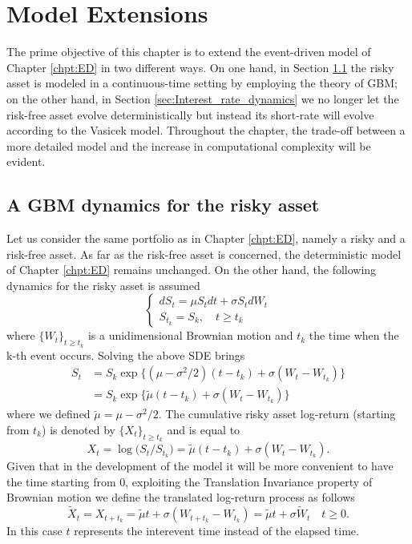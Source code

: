 \chapter{Model Extensions}
The prime objective of this chapter is to extend the event-driven model of Chapter \ref{chpt:ED} in two different ways. On one hand, in Section \ref{sec:GBM} the risky asset is modeled in a continuous-time setting by employing the theory of \gls{GBM}; on the other hand, in Section \ref{sec:Interest_rate_dynamics} we no longer let the risk-free asset evolve deterministically but instead its short-rate will evolve according to the Vasicek model. Throughout the chapter, the trade-off between a more detailed model and the increase in computational complexity will be evident.
\section{A GBM dynamics for the risky asset}\label{sec:GBM}
Let us consider the same portfolio as in Chapter \ref{chpt:ED}, namely a risky and a risk-free asset. As far as the risk-free asset is concerned, the deterministic model of Chapter \ref{chpt:ED} remains unchanged. On the other hand, the following dynamics for the risky asset is assumed
\[
\begin{cases*}
dS_t  = \mu S_t dt + \sigma S_t dW_t\\
S_{t_k} = S_k, \quad t\geq t_k
\end{cases*}
\]
where $\{W_t\}_{t\geq t_k}$ is a unidimensional Brownian motion and $t_k$ the time when the k-th event occurs. Solving the above \gls{SDE} brings 
\begin{align*}
S_t & = S_k \exp\big\{(\mu-\sigma^2/2)(t-t_k)+\sigma(W_t-W_{t_k})\}\\
& = S_k \exp\big\{\widetilde{\mu}(t-t_k)+\sigma(W_t-W_{t_k})\}
\end{align*}
where we defined $\widetilde{\mu}= \mu-\sigma^2/2$. The cumulative risky asset log-return (starting from $t_k$) is denoted by $\{X_t\}_{t\geq t_k}$ and is equal to
\begin{equation}
X_t = \log\big(S_t/S_{t_k}\big)=\widetilde{\mu}(t-t_k) + \sigma(W_t-W_{t_k}).
\end{equation}
Given that in the development of the model it will be more convenient to have the time starting from 0, exploiting the Translation Invariance property of Brownian motion we define the translated log-return process as follows
\begin{equation}\label{eq:translatedGBM}
\widetilde{X}_t = X_{t+t_k} = \widetilde{\mu}t + \sigma(W_{t+t_k}-W_{t_k}) = \widetilde{\mu}t + \sigma \widetilde{W}_t \quad t\geq 0.
\end{equation}
In this case $t$ represents the interevent time instead of the elapsed time.
